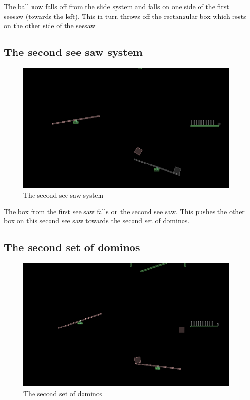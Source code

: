 \documentclass[a4paper,11pt]{article}
\begin{document}
	The ball now falls off from the slide system and falls on one side of the first seesaw (towards the left). This in turn throws off the rectangular box which rests on the other side of the seesaw

  \subsection{The second see saw system}
  	\begin{figure}
	\includegraphics[scale=0.35]{08_towards_second_seesaw.png}
	\caption{The second see saw system}
	\end{figure}  
  
	The box from the first see saw falls on the second see saw. This pushes the other box on this second see saw towards the second set of dominos.

  \subsection{The second set of dominos}
  	\begin{figure}
	\includegraphics[scale=0.35]{09_box_going_to_second_dominos.png}
	\caption{The second set of dominos}
	\end{figure}  
\end{document}

